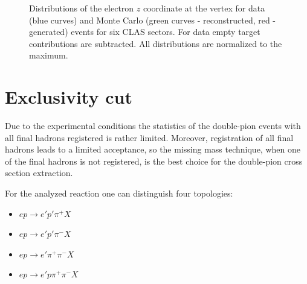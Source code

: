 \begin{figure}[htp]
\begin{center}
\caption{\small Distributions of the electron $z$ coordinate at the vertex for data (blue curves) and Monte Carlo (green curves - reconstructed, red - generated)  events for six CLAS sectors. For data empty target contributions are subtracted. All distributions are normalized to the maximum. \label{fig:vertex_cut_sim}}
\end{center}
\end{figure}




\section{Exclusivity cut}
\label{excl_cut}

Due to the experimental conditions the statistics of the double-pion events with all final hadrons registered is rather limited. Moreover, registration of all final hadrons leads to a limited acceptance, so the missing mass technique, when one of the final hadrons is  not registered, is the best choice for the double-pion cross section extraction.


For the analyzed reaction one can distinguish four topologies:
\begin{itemize}
\item $e p \rightarrow e' p' \pi^{+} X$
\item $e p \rightarrow e' p' \pi^{-} X$
\item $e p \rightarrow e' \pi^{+} \pi^{-} X$
\item $e p \rightarrow e' p \pi^{+} \pi^{-} X$
\end{itemize} 

